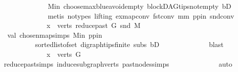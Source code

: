 \begin{isabellebody}
\ \ \ \ \ \ \ \ \ \ \ \ \isamarkupfalse%
\ M{\isacharunderscore}{\kern0pt}in\ choose{\isacharunderscore}{\kern0pt}max{\isacharunderscore}{\kern0pt}blue{\isacharunderscore}{\kern0pt}avoid{\isacharunderscore}{\kern0pt}empty\ blockDAG{\isachardot}{\kern0pt}tips{\isacharunderscore}{\kern0pt}not{\isacharunderscore}{\kern0pt}empty\ bD\isanewline
\ \ \ \ \ \ \ \ \ \ \ \ \isamarkupfalse%
\ {\isacharparenleft}{\kern0pt}metis\ {\isacharparenleft}{\kern0pt}no{\isacharunderscore}{\kern0pt}types{\isacharcomma}{\kern0pt}\ lifting{\isacharparenright}{\kern0pt}\ ex{\isacharunderscore}{\kern0pt}map{\isacharunderscore}{\kern0pt}conv\ fst{\isacharunderscore}{\kern0pt}conv\ mm\ pp{\isacharunderscore}{\kern0pt}in\ snd{\isacharunderscore}{\kern0pt}conv{\isacharparenright}{\kern0pt}\ \isanewline
\ \ \ \ \ \ \ \ \ \ \isamarkupfalse%
\ \isamarkupfalse%
\ {\isachardoublequoteopen}x\ {\isasymin}\ verts\ {\isacharparenleft}{\kern0pt}reduce{\isacharunderscore}{\kern0pt}past\ G\ {\isacharparenleft}{\kern0pt}snd\ M{\isacharparenright}{\kern0pt}{\isacharparenright}{\kern0pt}{\isachardoublequoteclose}\ \isamarkupfalse%
\ {}\ val\ chosen{\isacharunderscore}{\kern0pt}map{\isacharunderscore}{\kern0pt}simps\ M{\isacharunderscore}{\kern0pt}in\ pp{\isacharunderscore}{\kern0pt}in\ \isanewline
\ \ \ \ \ \ \ \ \ \ sorted{\isacharunderscore}{\kern0pt}list{\isacharunderscore}{\kern0pt}of{\isacharunderscore}{\kern0pt}set{\isacharparenleft}{\kern0pt}{}{\isacharparenright}{\kern0pt}\ digraph{\isachardot}{\kern0pt}tips{\isacharunderscore}{\kern0pt}finite\ subs\ bD\isanewline
\ \ \ \ \ \ \ \ \ \ \ \ \isamarkupfalse%
\ blast\ \isanewline
\ \ \ \ \ \ \ \ \ \ \isamarkupfalse%
\ \isamarkupfalse%
\ {\isachardoublequoteopen}x\ {\isasymin}\ verts\ G{\isachardoublequoteclose}\ \isamarkupfalse%
\ reduce{\isacharunderscore}{\kern0pt}past{\isachardot}{\kern0pt}simps\ induce{\isacharunderscore}{\kern0pt}subgraph{\isacharunderscore}{\kern0pt}verts\ past{\isacharunderscore}{\kern0pt}nodes{\isachardot}{\kern0pt}simps\isanewline
\ \ \ \ \ \ \ \ \ \ \ \ \isamarkupfalse%
\ auto\isanewline
\ \ \ \ \ \ \ \ \isamarkupfalse%
\isanewline
\ \ \ \ \ \ \isamarkupfalse%
\ \isanewline
\ \ \ \ \isamarkupfalse%
\isanewline
\ \ \isamarkupfalse%
\isanewline
{}\isamarkupfalse%
%
\endisatagproof
{\isafoldproof}%
%
\isadelimproof
\isanewline
%
\endisadelimproof
\isanewline

\end{isabellebody}
